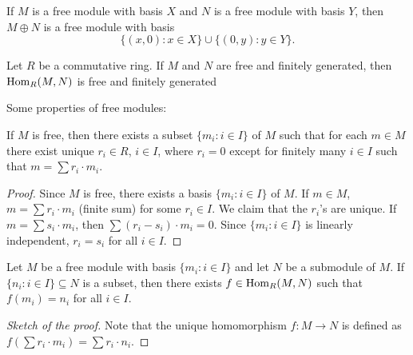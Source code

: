\begin{example}
If $M$ is a free module with basis $X$ and $N$ 
is a free module with basis $Y$, then 
$M\oplus N$ is a free module with basis 
\[
\{(x,0):x\in X\}\cup \{(0,y):y\in Y\}.
\]	
\end{example}

\begin{exercise}
Let $R$ be a commutative ring. If $M$ and $N$ 
are free and finitely generated, then 
$\operatorname{Hom}_R(M,N)$
is free and finitely generated
\end{exercise}

Some properties of free modules:

\begin{proposition}
If $M$ is free, then there exists a subset $\{m_i:i\in I\}$ of $M$ 
such that for each $m\in M$ there exist unique $r_i\in R$, $i\in I$, 
where $r_i=0$ except for finitely many $i\in I$ 
such that $m=\sum r_i\cdot m_i$. 
\end{proposition}

\begin{proof}
Since $M$ is free, there exists a basis $\{m_i:i\in I\}$ of $M$. If $m\in M$,
$m=\sum r_i\cdot m_i$ (finite sum) for some $r_i\in I$. We claim that
the $r_i$'s are unique. If $m=\sum s_i\cdot m_i$, then
$\sum (r_i-s_i)\cdot m_i=0$. Since $\{m_i:i\in I\}$ 
is linearly independent, $r_i=s_i$ for all $i\in I$.  	
\end{proof}

\begin{proposition}
\label{pro:libre}
Let $M$ be a free module with basis $\{m_i:i\in I\}$ and let $N$ be a submodule of $M$. 
If $\{n_i:i\in I\}\subseteq N$ is a subset, then 
there exists $f\in\operatorname{Hom}_R(M,N)$ such that
$f(m_i)=n_i$ for all $i\in I$.  
\end{proposition}

\begin{proof}[Sketch of the proof]
Note that the unique homomorphism $f\colon M\to N$ is defined as 
$f(\sum r_i\cdot m_i)=\sum r_i\cdot n_i$.  	
\end{proof}

